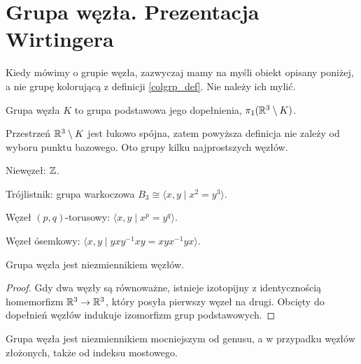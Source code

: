 \section{Grupa węzła. Prezentacja Wirtingera} %
\label{sec:group_wirtinger}
Kiedy mówimy o grupie węzła,
zazwyczaj mamy na myśli obiekt opisany poniżej,
a nie grupę kolorującą z definicji \ref{colgrp_def}.
Nie należy ich mylić.

\begin{definition}
    \label{def:knot_group}
    Grupa węzła $K$ to grupa podstawowa jego dopełnienia, $\pi_1(\mathbb R^3 \setminus K)$.
\end{definition}

Przestrzeń $\mathbb R^3 \setminus K$ jest łukowo spójna,
zatem powyższa definicja nie zależy od wyboru punktu bazowego.
Oto grupy kilku najprostszych węzłów.

\begin{example}
    Niewęzeł: $\mathbb Z$.
\end{example}

\begin{example}
    Trójlistnik: grupa warkoczowa $B_3 \cong \langle x, y \mid x^2 = y^3\rangle$.
\end{example}

\begin{example}
    Węzeł $(p,q)$-torusowy: $\langle x, y \mid x^p = y^q \rangle$.
\end{example}

\begin{example}
    Węzeł ósemkowy: $\langle x, y \mid yxy^{{-1}}xy=xyx^{{-1}}yx \rangle$.
\end{example}

\begin{proposition}
    \label{prop:knot_group_invariant}
    Grupa węzła jest niezmiennikiem węzłów.
\end{proposition}

\begin{proof}
    Gdy dwa węzły są równoważne,
    istnieje izotopijny z identycznością homemorfizm $\mathbb R^3 \to \mathbb R^3$,
    który posyła pierwszy węzeł na drugi.
    Obcięty do dopełnień węzłów indukuje izomorfizm grup podstawowych.
\end{proof}

\begin{proposition}
    Grupa węzła jest niezmiennikiem mocniejszym od genusu, a w przypadku węzłów złożonych, także od indeksu mostowego.
\end{proposition}

